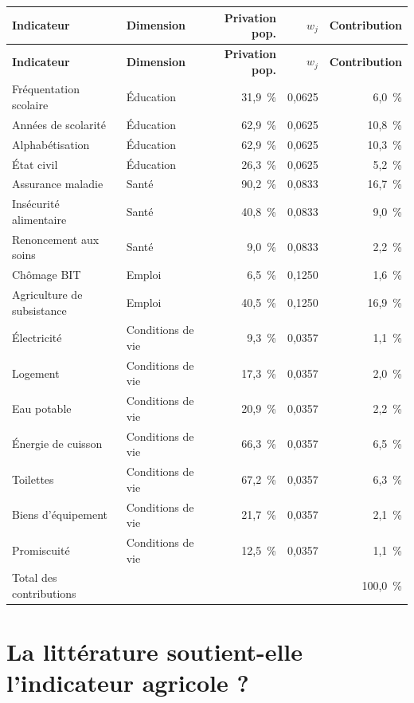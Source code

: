 \documentclass[11pt,a4paper]{article}
\begin{document}
\begin{center}
\scriptsize
\begin{longtable}{@{}p{3.4cm}p{2.6cm}rrr@{}}
\toprule
\textbf{Indicateur} & \textbf{Dimension} & \textbf{Privation pop.} & $w_j$ &
\textbf{Contribution} \\
\midrule
\endfirsthead
\toprule
\textbf{Indicateur} & \textbf{Dimension} & \textbf{Privation pop.} & $w_j$ &
\textbf{Contribution} \\
\midrule
\endhead
Fréquentation scolaire & Éducation & 31,9~\% & 0,0625 & 6,0~\% \\
Années de scolarité & Éducation & 62,9~\% & 0,0625 & 10,8~\% \\
Alphabétisation & Éducation & 62,9~\% & 0,0625 & 10,3~\% \\
État civil & Éducation & 26,3~\% & 0,0625 & 5,2~\% \\
Assurance maladie & Santé & 90,2~\% & 0,0833 & 16,7~\% \\
Insécurité alimentaire & Santé & 40,8~\% & 0,0833 & 9,0~\% \\
Renoncement aux soins & Santé & 9,0~\% & 0,0833 & 2,2~\% \\
Chômage BIT & Emploi & 6,5~\% & 0,1250 & 1,6~\% \\
Agriculture de subsistance & Emploi & 40,5~\% & 0,1250 & 16,9~\% \\
Électricité & Conditions de vie & 9,3~\% & 0,0357 & 1,1~\% \\
Logement & Conditions de vie & 17,3~\% & 0,0357 & 2,0~\% \\
Eau potable & Conditions de vie & 20,9~\% & 0,0357 & 2,2~\% \\
Énergie de cuisson & Conditions de vie & 66,3~\% & 0,0357 & 6,5~\% \\
Toilettes & Conditions de vie & 67,2~\% & 0,0357 & 6,3~\% \\
Biens d'équipement & Conditions de vie & 21,7~\% & 0,0357 & 2,1~\% \\
Promiscuité & Conditions de vie & 12,5~\% & 0,0357 & 1,1~\% \\
\midrule
Total des contributions & & & & 100,0~\% \\
\bottomrule
\end{longtable}
\end{center}

\section{La littérature soutient-elle l'indicateur agricole ?}
\end{document}
